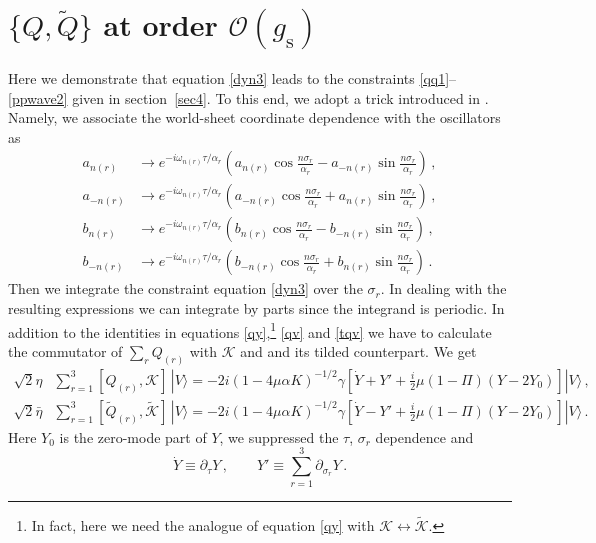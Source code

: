 \documentclass[12pt]{article}
\def\a{\alpha}
\def\g{\gamma}
\def\m{\mu}
\def\s{\sigma}
\def\t{\tau}
\def\o{\omega}
\def\mc{\mathcal}
\def\p{\partial}
\def\ra{\rangle}
\def\wt{\widetilde}
\numberwithin{equation}{section} \setlength{\textwidth}{17cm}
\begin{document}
\section{$\{Q,\wt{Q}\}$ at order ${\mc O}(g_{\text{s}})$}\label{appC}
\setcounter{section}{3}
\renewcommand{\thesection}{\Alph{section}}
\setcounter{equation}{0}
Here we demonstrate that equation \eqref{dyn3} leads to the constraints 
\eqref{qq1}--\eqref{ppwave2} given in section~\ref{sec4}.
To this end, we adopt a trick introduced in \cite{gsb}. Namely, we associate
the world-sheet coordinate dependence with the oscillators as
\begin{align}
a_{n(r)} &\to e^{-i\o_{n(r)}\t/\a_r}
\left(a_{n(r)}\cos\frac{n\s_r}{\a_r}-a_{-n(r)}\sin\frac{n\s_r}{\a_r}\right)\,,\\
a_{-n(r)} &\to e^{-i\o_{n(r)}\t/\a_r}
\left(a_{-n(r)}\cos\frac{n\s_r}{\a_r}+a_{n(r)}\sin\frac{n\s_r}{\a_r}\right)\,,\\
b_{n(r)} &\to e^{-i\o_{n(r)}\t/\a_r}
\left(b_{n(r)}\cos\frac{n\s_r}{\a_r}-b_{-n(r)}\sin\frac{n\s_r}{\a_r}\right)\,,\\
b_{-n(r)} &\to e^{-i\o_{n(r)}\t/\a_r}
\left(b_{-n(r)}\cos\frac{n\s_r}{\a_r}+b_{n(r)}\sin\frac{n\s_r}{\a_r}\right)\,.
\end{align}
Then we integrate the constraint equation \eqref{dyn3}
over the $\s_r$. In dealing with the resulting expressions we can
integrate by parts since the integrand is periodic.
In addition to the identities in equations \eqref{qy},\footnote{In fact, here
we need the analogue of equation \eqref{qy} with
${\mc K}\leftrightarrow\wt{\mc K}$.}
\eqref{qv} and \eqref{tqv} we have to calculate the
commutator of $\sum_rQ_{(r)}$ with ${\mc K}$ and and its tilded
counterpart. We get
\begin{equation}
\begin{split}
\sqrt{2}\eta &\sum_{r=1}^3[Q_{(r)},{\mc K}]\,|V\ra=-2i(1-4\m\a 
K)^{-1/2}\g
\left[\dot{Y}+Y'+\frac{i}{2}\m(1-\Pi)\left(Y-2Y_0\right)\right]|V\ra\,,\\
\sqrt{2}\bar{\eta}&\sum_{r=1}^3[\wt{Q}_{(r)},\wt{\mc 
K}]\,|V\ra=-2i
(1-4\m\a K)^{-1/2}\g\left[\dot{Y}-Y'+\frac{i}{2}\m(1-\Pi)\left(Y-2Y_0\right)\right]|V\ra\,.
\end{split}
\end{equation}
Here $Y_0$ is the zero-mode part of $Y$, we suppressed the $\t$, $\s_r$ dependence and
\begin{equation}
\dot{Y}\equiv\p_{\t}Y\,,\qquad Y'\equiv\sum_{r=1}^3\p_{\s_r}Y\,.
\end{equation}
\end{document}
